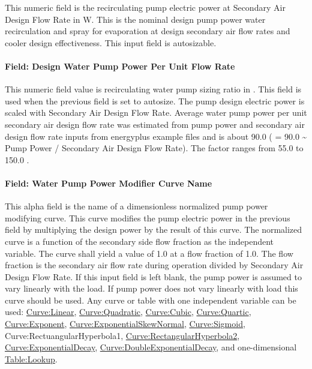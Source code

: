 This numeric field is the recirculating pump electric power at Secondary Air Design Flow Rate in W. This is the nominal design pump power water recirculation and spray for evaporation at design secondary air flow rates and cooler design effectiveness. This input field is autosizable.

\paragraph{Field: Design Water Pump Power Per Unit Flow Rate}\label{field-design-water-pump-power-per-unit-flow-rate-1}

This numeric field value is recirculating water pump sizing ratio in \si{\wattperVolumeFlowRate}. This field is used when the previous field is set to autosize. The pump design electric power is scaled with Secondary Air Design Flow Rate. Average water pump power per unit secondary air design flow rate was estimated from pump power and secondary air design flow rate inputs from energyplus example files and is about 90.0 \si{\wattperVolumeFlowRate} ( = 90.0 \textasciitilde{} Pump Power / Secondary Air Design Flow Rate). The factor ranges from 55.0 to 150.0 \si{\wattperVolumeFlowRate}.

\paragraph{Field: Water Pump Power Modifier Curve Name}\label{field-water-pump-power-modifier-curve-name-1}

This alpha field is the name of a dimensionless normalized pump power modifying curve. This curve modifies the pump electric power in the previous field by multiplying the design power by the result of this curve. The normalized curve is a function of the secondary side flow fraction as the independent variable. The curve shall yield a value of 1.0 at a flow fraction of 1.0. The flow fraction is the secondary air flow rate during operation divided by Secondary Air Design Flow Rate. If this input field is left blank, the pump power is assumed to vary linearly with the load. If pump power does not vary linearly with load this curve should be used. Any curve or table with one independent variable can be used: \hyperref[curvelinear]{Curve:Linear}, \hyperref[curvequadratic]{Curve:Quadratic}, \hyperref[curvecubic]{Curve:Cubic}, \hyperref[curvequartic]{Curve:Quartic}, \hyperref[curveexponent]{Curve:Exponent}, \hyperref[curveexponentialskewnormal]{Curve:ExponentialSkewNormal}, \hyperref[curvesigmoid]{Curve:Sigmoid}, Curve:RectuangularHyperbola1, \hyperref[curverectangularhyperbola2]{Curve:RectangularHyperbola2}, \hyperref[curveexponentialdecay]{Curve:ExponentialDecay}, \hyperref[curvedoubleexponentialdecay]{Curve:DoubleExponentialDecay}, and one-dimensional \hyperref[tablelookup]{Table:Lookup}.

